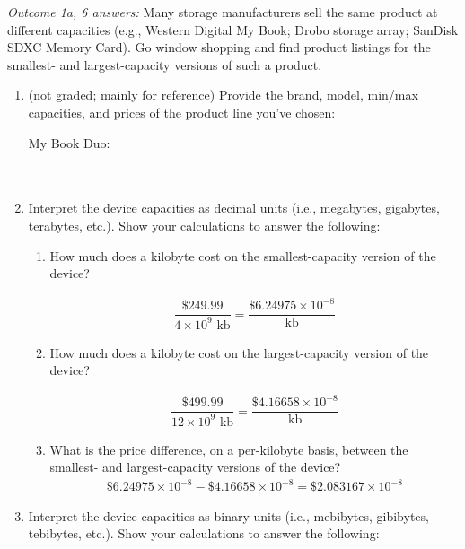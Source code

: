 \documentclass[11pt]{article}
\begin{document}
\emph{Outcome 1a, 6 answers:} Many storage manufacturers sell the same product at different capacities
(e.g., Western Digital My Book; Drobo storage array; SanDisk SDXC Memory Card). Go window shopping and
find product listings for the smallest- and largest-capacity versions of such a product.
\begin{enumerate}
\item (not graded; mainly for reference) Provide the brand, model, min/max capacities, and prices of the
product line you've chosen:

My Book Duo:\\ 
\indent\indent\indent{}\\
\indent\indent\indent{}\\

\item Interpret the device capacities as decimal units (i.e., megabytes, gigabytes, terabytes, etc.).
Show your calculations to answer the following:

\begin{enumerate}
\item How much does a kilobyte cost on the smallest-capacity version of the device?

\begin{align*}
\dfrac{\$249.99}{4\times10^{9}\text{ kb}} = \boxed{\dfrac{\$6.24975\times10^{-8}}{\text{kb}}}
\end{align*}


\item How much does a kilobyte cost on the largest-capacity version of the device?

\begin{align*}
\dfrac{\$499.99}{12\times10^{9}\text{ kb}} = \boxed{\dfrac{\$4.16658\times10^{-8}}{\text{kb}}}
\end{align*}

\item What is the price difference, on a per-kilobyte basis, between the smallest-
and largest-capacity versions of the device?
\begin{align*}
\$6.24975\times10^{-8} - \$4.16658\times10^{-8} = \boxed{\$2.083167\times10^{-8}}
\end{align*}

\end{enumerate}

\item Interpret the device capacities as binary units (i.e., mebibytes, gibibytes, tebibytes, etc.).
Show your calculations to answer the following:


\end{enumerate}
\end{document}
